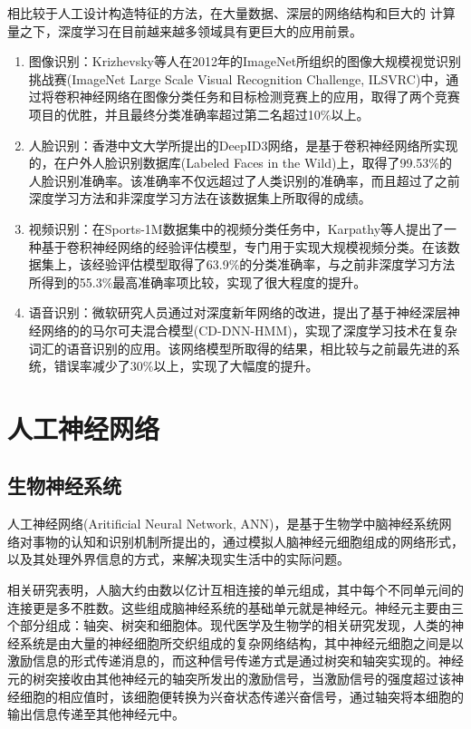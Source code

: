 相比较于人工设计构造特征的方法，在大量数据、深层的网络结构和巨大的 计算量之下，深度学习在目前越来越多领域具有更巨大的应用前景。
\begin{enumerate}
\item 图像识别：Krizhevsky等人\cite{krizhevsky2012imagenet}在2012年的ImageNet所组织的图像大规模视觉识别挑战赛(ImageNet Large Scale Visual Recognition Challenge, ILSVRC)中，通过将卷积神经网络在图像分类任务和目标检测竞赛上的应用，取得了两个竞赛项目的优胜，并且最终分类准确率超过第二名超过10\%以上。
\item 人脸识别：香港中文大学所提出的DeepID3网络\cite{sun2015deepid3}，是基于卷积神经网络所实现的，在户外人脸识别数据库(Labeled Faces in the Wild)上，取得了99.53\%的人脸识别准确率。该准确率不仅远超过了人类识别的准确率，而且超过了之前深度学习方法和非深度学习方法在该数据集上所取得的成绩。
\item 视频识别：在Sports-1M数据集中的视频分类任务中，Karpathy等人\cite{karpathy2014large}提出了一种基于卷积神经网络的经验评估模型，专门用于实现大规模视频分类。在该数据集上，该经验评估模型取得了63.9\%的分类准确率，与之前非深度学习方法所得到的55.3\%最高准确率项比较，实现了很大程度的提升。
\item 语音识别：微软研究人员通过对深度新年网络的改进，提出了基于神经深层神经网络的的马尔可夫混合模型(CD-DNN-HMM)\cite{dahl2012context}，实现了深度学习技术在复杂词汇的语音识别的应用。该网络模型所取得的结果，相比较与之前最先进的系统，错误率减少了30\%以上，实现了大幅度的提升。
\end{enumerate}

\section{人工神经网络}

\subsection{生物神经系统}
人工神经网络(Aritificial Neural Network, ANN)，是基于生物学中脑神经系统网络对事物的认知和识别机制所提出的，通过模拟人脑神经元细胞组成的网络形式，以及其处理外界信息的方式，来解决现实生活中的实际问题。 


相关研究表明，人脑大约由数以亿计互相连接的单元组成，其中每个不同单元间的连接更是多不胜数。这些组成脑神经系统的基础单元就是神经元。神经元主要由三个部分组成：轴突、树突和细胞体。现代医学及生物学的相关研究发现，人类的神经系统是由大量的神经细胞所交织组成的复杂网络结构，其中神经元细胞之间是以激励信息的形式传递消息的，而这种信号传递方式是通过树突和轴突实现的。神经元的树突接收由其他神经元的轴突所发出的激励信号，当激励信号的强度超过该神经细胞的相应值时，该细胞便转换为兴奋状态传递兴奋信号，通过轴突将本细胞的输出信息传递至其他神经元中。 


